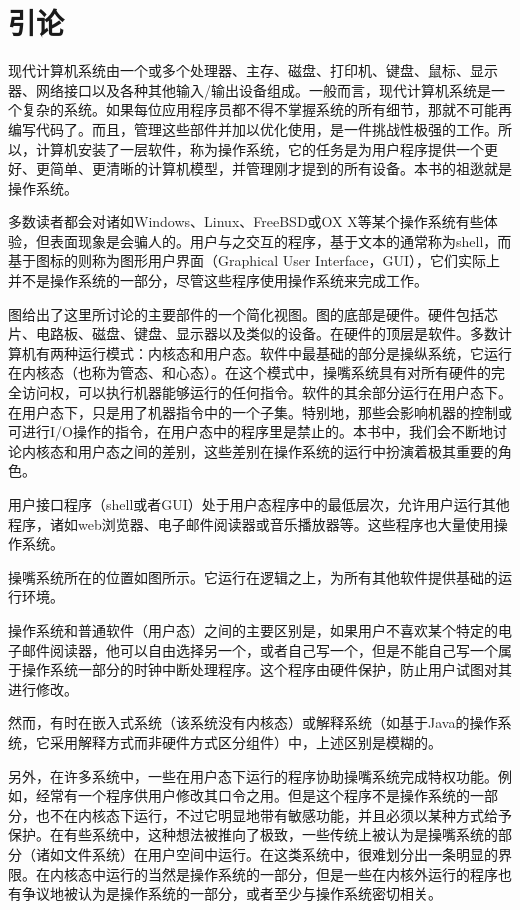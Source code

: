 \chapter{引论}
现代计算机系统由一个或多个处理器、主存、磁盘、打印机、键盘、鼠标、显示器、网络接口以及各种其他输入/输出设备组成。一般而言，现代计算机系统是一个复杂的系统。如果每位应用程序员都不得不掌握系统的所有细节，那就不可能再编写代码了。而且，管理这些部件并加以优化使用，是一件挑战性极强的工作。所以，计算机安装了一层软件，称为操作系统，它的任务是为用户程序提供一个更好、更简单、更清晰的计算机模型，并管理刚才提到的所有设备。本书的祖逖就是操作系统。
\par 多数读者都会对诸如Windows、Linux、FreeBSD或OX X等某个操作系统有些体验，但表面现象是会骗人的。用户与之交互的程序，基于文本的通常称为shell，而基于图标的则称为图形用户界面（Graphical User Interface，GUI），它们实际上并不是操作系统的一部分，尽管这些程序使用操作系统来完成工作。
\par 图给出了这里所讨论的主要部件的一个简化视图。图的底部是硬件。硬件包括芯片、电路板、磁盘、键盘、显示器以及类似的设备。在硬件的顶层是软件。多数计算机有两种运行模式：内核态和用户态。软件中最基础的部分是操纵系统，它运行在内核态（也称为管态、和心态）。在这个模式中，操嘴系统具有对所有硬件的完全访问权，可以执行机器能够运行的任何指令。软件的其余部分运行在用户态下。在用户态下，只是用了机器指令中的一个子集。特别地，那些会影响机器的控制或可进行I/O操作的指令，在用户态中的程序里是禁止的。本书中，我们会不断地讨论内核态和用户态之间的差别，这些差别在操作系统的运行中扮演着极其重要的角色。
\par 用户接口程序（shell或者GUI）处于用户态程序中的最低层次，允许用户运行其他程序，诸如web浏览器、电子邮件阅读器或音乐播放器等。这些程序也大量使用操作系统。
\par 操嘴系统所在的位置如图所示。它运行在逻辑之上，为所有其他软件提供基础的运行环境。
\par 操作系统和普通软件（用户态）之间的主要区别是，如果用户不喜欢某个特定的电子邮件阅读器，他可以自由选择另一个，或者自己写一个，但是不能自己写一个属于操作系统一部分的时钟中断处理程序。这个程序由硬件保护，防止用户试图对其进行修改。
\par 然而，有时在嵌入式系统（该系统没有内核态）或解释系统（如基于Java的操作系统，它采用解释方式而非硬件方式区分组件）中，上述区别是模糊的。
\par 另外，在许多系统中，一些在用户态下运行的程序协助操嘴系统完成特权功能。例如，经常有一个程序供用户修改其口令之用。但是这个程序不是操作系统的一部分，也不在内核态下运行，不过它明显地带有敏感功能，并且必须以某种方式给予保护。在有些系统中，这种想法被推向了极致，一些传统上被认为是操嘴系统的部分（诸如文件系统）在用户空间中运行。在这类系统中，很难划分出一条明显的界限。在内核态中运行的当然是操作系统的一部分，但是一些在内核外运行的程序也有争议地被认为是操作系统的一部分，或者至少与操作系统密切相关。
